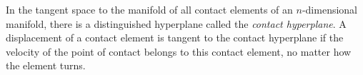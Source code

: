 In the tangent space to the manifold of all contact elements of an $n$-dimensional manifold, there is a distinguished hyperplane called the \textit{contact hyperplane}. A displacement of a contact element is tangent to the contact hyperplane if the velocity of the point of contact belongs to this contact element, no matter how the element turns.
